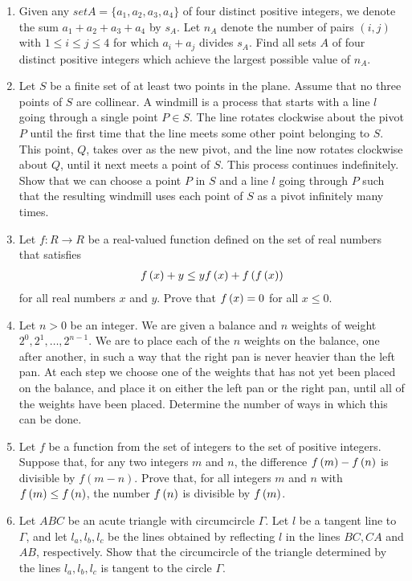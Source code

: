 \documentclass{article}
\begin{document}
\begin{enumerate}
	\item Given any $setA=\{a_{1}, a_{2}, a_{3}, a_{4}\}$ of four distinct positive integers, we denote the sum $a_{1}+a_{2}+a_{3}+a_{4}$ by $s_{A}$. Let $n_{A}$ denote the number of pairs $ ( i, j) $ with $1\leq{i}\leq{j}\leq{4}$ for which $a_{i}+a_{j}$ divides $s_{A}$. Find all sets $A$ of four distinct positive integers which achieve the largest possible value of $n_{A}$.
\item Let $S$ be a finite set of at least two points in the plane. Assume that no three points of $S$ are collinear. A windmill is a process that starts with a line $l$ going through a single point $P \in S$. The line rotates clockwise about the pivot $P$ until the first time that the line meets some other point belonging to $S$. This point, $Q$, takes over as the new pivot, and the line now rotates clockwise about $Q$, until it next meets a point of $S$. This process continues indefinitely.
	Show that we can choose a point $P$ in $S$ and a line $l$ going through $P$ such that the resulting windmill uses each point of $S$ as a pivot infinitely many times.
\item Let $f:R \rightarrow R$ be a real-valued function defined on the set of real numbers that satisfies
	\begin{align}
	f \left(x\right)+y \leq {y f \ensuremath{\left(x\right)}}+f \left(f \left(x\right) \right) 
	\end{align}
		for all real numbers $x$ and $y$. Prove that $f \left(x\right)=0$ for all $x\leq{0}$.
	\item Let $n > 0$ be an integer. We are given a balance and $n$ weights of weight $2^{0}, 2^{1}, \dots, 2^{n-1}$. We are to place each of the $n$ weights on the balance, one after another, in such a way that the right pan is never heavier than the left pan. At each step we choose one of the weights that has not yet been placed on the balance, and place it on either the left pan or the right pan, until all of the weights have been placed.
		Determine the number of ways in which this can be done.
	\item  Let $f$ be a function from the set of integers to the set of positive integers. Suppose that, for any two integers $m$ and $n$, the difference $f \left(m\right) -f \left(n\right) $ is divisible by $f ( m-n) $. Prove that, for all integers $m$ and $n$ with $f \left(m\right)  \leq {f \ensuremath{\left(n\right)} }$, the number $f \left(n\right) $ is divisible by $f \left(m\right) $.
	\item Let $ABC$ be an acute triangle with circumcircle $\Gamma$. Let $l$ be a tangent line to $\Gamma$, and let $l_{a}, l_{b}, l_{c}$ be the lines obtained by reflecting $l$ in the lines $BC, CA$ and $AB$, respectively. Show that the circumcircle of the triangle determined by the lines $l_{a}, l_{b}, l_{c}$ is tangent to the circle $\Gamma$.
\end{enumerate}
\end{document}
